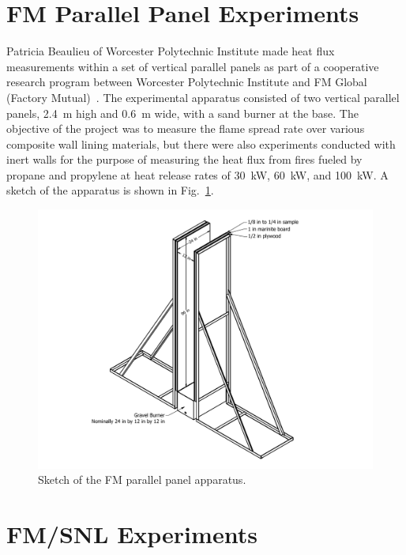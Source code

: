 \section{FM Parallel Panel Experiments}
\label{FM_Parallel_Panel_Description}

Patricia Beaulieu of Worcester Polytechnic Institute made heat flux measurements within a set of vertical parallel panels as part of a cooperative research program between Worcester Polytechnic Institute and FM Global (Factory Mutual)~\cite{Beaulieu:FM}. The experimental apparatus consisted of two vertical parallel panels, 2.4~m high and 0.6~m wide, with a sand burner at the base. The objective of the project was to measure the flame spread rate over various composite wall lining materials, but there were also experiments conducted with inert walls for the purpose of measuring the heat flux from fires fueled by propane and propylene at heat release rates of 30~kW, 60~kW, and 100~kW. A sketch of the apparatus is shown in Fig.~\ref{Parallel_Panel_Sketch}.

\begin{figure}[!ht]
\includegraphics[width=\textwidth]{FIGURES/FM_Parallel_Panel/Full_Assembly}
\caption[Sketch of the FM parallel panel apparatus]{Sketch of the FM parallel panel apparatus.}
\label{Parallel_Panel_Sketch}
\end{figure}



\section{FM/SNL Experiments}
\label{FM_SNL_Description}


